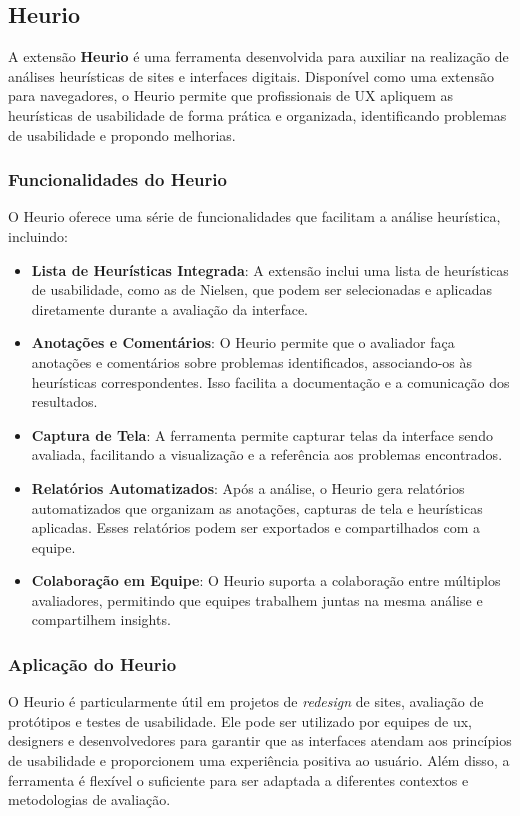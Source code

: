 \subsection{Heurio}
A extensão \textbf{Heurio} é uma ferramenta desenvolvida para auxiliar na realização de análises heurísticas de sites e interfaces digitais. Disponível como uma extensão para navegadores, o Heurio permite que profissionais de UX apliquem as heurísticas de usabilidade de forma prática e organizada, identificando problemas de usabilidade e propondo melhorias.

\subsubsection{Funcionalidades do Heurio}
O Heurio oferece uma série de funcionalidades que facilitam a análise heurística, incluindo:

\begin{itemize}
    \item \textbf{Lista de Heurísticas Integrada}: A extensão inclui uma lista de heurísticas de usabilidade, como as de Nielsen, que podem ser selecionadas e aplicadas diretamente durante a avaliação da interface.
    
    \item \textbf{Anotações e Comentários}: O Heurio permite que o avaliador faça anotações e comentários sobre problemas identificados, associando-os às heurísticas correspondentes. Isso facilita a documentação e a comunicação dos resultados.
    
    \item \textbf{Captura de Tela}: A ferramenta permite capturar telas da interface sendo avaliada, facilitando a visualização e a referência aos problemas encontrados.
    
    \item \textbf{Relatórios Automatizados}: Após a análise, o Heurio gera relatórios automatizados que organizam as anotações, capturas de tela e heurísticas aplicadas. Esses relatórios podem ser exportados e compartilhados com a equipe.
    
    \item \textbf{Colaboração em Equipe}: O Heurio suporta a colaboração entre múltiplos avaliadores, permitindo que equipes trabalhem juntas na mesma análise e compartilhem insights.
\end{itemize}

\subsubsection{Aplicação do Heurio}
O Heurio é particularmente útil em projetos de \textit{redesign} de sites, avaliação de protótipos e testes de usabilidade. Ele pode ser utilizado por equipes de \gls{ux}, designers e desenvolvedores para garantir que as interfaces atendam aos princípios de usabilidade e proporcionem uma experiência positiva ao usuário. Além disso, a ferramenta é flexível o suficiente para ser adaptada a diferentes contextos e metodologias de avaliação.


